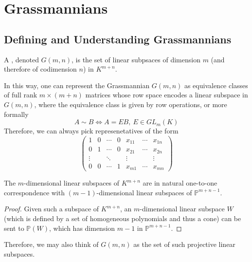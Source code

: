 \documentclass[11pt,leqno,oneside]{amsart}
\numberwithin{thm}{section}
\renewcommand{\P}{\mathbb{P}}
\begin{document}
\section{Grassmannians}
\subsection{Defining and Understanding Grassmannians}
\begin{defn}
  A , denoted \(G(m,n)\), is the set of
  linear subpsaces of dimension \(m\) 
  (and therefore of codimension \(n\)) in \(K^{m+n}\). 
\end{defn}
In this way, one can represent the Grassmannian \(G(m,n)\) as
equivalence classes of full rank \(m \times (m+n)\) matrices whose 
row space encodes a linear subspace in \(G(m,n)\),
where the equivalence class is given by row operations, or more
formally \[ 
  A \sim B \iff A = E B,\ E \in GL_m(K)
\]
Therefore, we can always pick represenetatives of the form \[
  \left(
    \begin{array}{ccccccc}
      1&0&\cdots&0&x_{11}&\cdots&x_{1n}\\
      0&1&\cdots&0&x_{21}&\cdots&x_{2n}\\
      \vdots&&\ddots&&\vdots&&\vdots\\
      0&0&\cdots&1&x_{m1}&\cdots&x_{mn}
    \end{array}
\right)
\]
\begin{prop}
  The \(m\)-dimensional linear subspaces of \(K^{m+n}\) are in natural
  one-to-one correspondence with \((m-1)\)-dimensional linear
  subspaces of \(\P^{m+n-1}\). 
\end{prop}
\begin{proof}
  Given such a subspace of \(K^{m+n}\), an \(m\)-dimensional linear
  subspace \(W\) (which is defined by a set of homogeneous
  polynomials and thus a cone) can be sent to \(\P(W)\), which has
  dimension \(m-1\) in \(\P^{m+n-1}\).
\end{proof}
Therefore, we may also think of \(G(m,n)\) as the set of such
projective linear subspaces.
\end{document}
